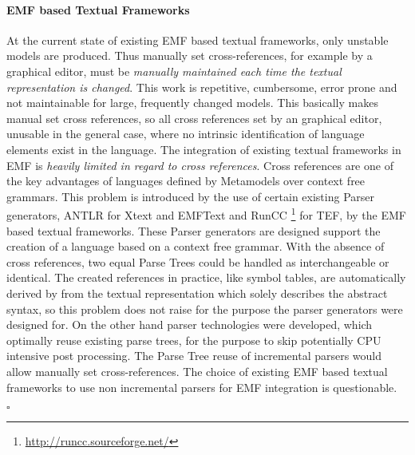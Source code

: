 \paragraph{EMF based Textual Frameworks}
At the current state of existing EMF based textual frameworks, only unstable models are produced. Thus manually set cross-references, for example by a graphical editor, must be \emph{manually maintained each time the textual representation is changed}. This work is repetitive, cumbersome, error prone and not maintainable for large, frequently changed models. This basically makes manual set cross references, so all cross references set by an graphical editor, unusable in the general case, where no intrinsic identification of language elements exist in the language. The integration of existing textual frameworks in EMF is \emph{heavily limited in regard to cross references}. Cross references are one of the key advantages of languages defined by Metamodels over context free grammars. This problem is introduced by the use of certain existing Parser generators, ANTLR for Xtext and EMFText and RunCC \footnote{\raggedright \url{http://runcc.sourceforge.net/}} for TEF, by the EMF based textual frameworks. These Parser generators are designed support the creation of a language based on a context free grammar. With the absence of cross references, two equal Parse Trees could be handled as interchangeable or identical. The created references in practice, like symbol tables, are automatically derived by from the textual representation which solely describes the abstract syntax, so this problem does not raise for the purpose the parser generators were designed for. On the other hand parser technologies were developed, which optimally reuse existing parse trees, for the purpose to skip potentially CPU intensive post processing. The Parse Tree reuse of incremental parsers would allow manually set cross-references. The choice of existing EMF based textual frameworks to use non incremental parsers for EMF integration is questionable.

$\square$
